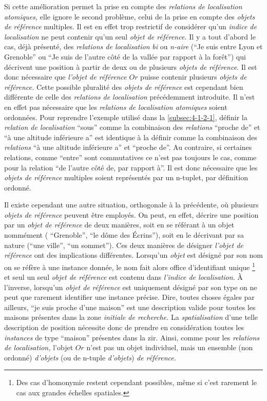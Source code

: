 Si cette amélioration permet la prise en compte des \emph{relations de
  localisation atomiques,} elle ignore le second problème, celui de la
prise en compte des \emph{objets de référence} multiples. Il est en
effet trop restrictif de considérer qu'un \emph{indice de
  localisation} ne peut contenir qu'un seul \emph{objet de référence.}
Il y a tout d'abord le cas, déjà présenté, des \emph{relations de
  localisation} \emph{bi} ou \emph{n-aire} (\eg \enquote{Je suis entre
  Lyon et Grenoble} ou \enquote{Je suis de l'autre côté de la vallée
  par rapport à la forêt}) qui décrivent une position à partir de deux
ou de plusieurs \emph{objets de référence}. Il est donc nécessaire que
\emph{l'objet de référence} \(Or\) puisse contenir plusieurs
\emph{objets de référence.} Cette possible pluralité des \emph{objets
  de référence} est cependant bien différente de celle des
\emph{relations de localisation} précédemment introduite. Il n'est en
effet pas nécessaire que les \emph{relations de localisation
  atomiques} soient ordonnées. Pour reprendre l'exemple utilisé dans
la \autoref{subsec:4-1-2-1}, définir la \emph{relation de
  localisation} \enquote{sous} comme la combinaison des
\emph{relations} \enquote{proche de} et \enquote{à une altitude
  inférieure a} est identique à la définir comme la combinaison des
\emph{relations} \enquote{à une altitude inférieure a} et
\enquote{proche de}. Au contraire, si certaines relations, comme
\enquote{entre} sont commutatives ce n'est pas toujours le cas, comme
pour la relation \enquote{de l'autre côté de, par rapport à}. Il est
donc nécessaire que les \emph{objets de référence} multiples soient
représentés par un n-tuplet, par définition ordonné.

Il existe cependant une autre situation, orthogonale à la précédente,
où plusieurs \emph{objets de référence} peuvent être employés. On
peut, en effet, décrire une position par un \emph{objet de référence}
de deux manières, soit en se référant à un objet nommément (\eg
\enquote{Grenoble}, \enquote{le dôme des Écrins}), soit en le
décrivant par sa nature (\eg \enquote{une ville}, \enquote{un
  sommet}). Ces deux manières de désigner \emph{l'objet de référence}
ont des implications différentes. Lorsqu'un \emph{objet} est désigné
par son nom on se réfère à une instance donnée, le nom fait alors
office d'identifiant unique \footnote{Des cas d’homonymie restent
  cependant possibles, même si c'est rarement le cas aux grandes
  échelles spatiales.} et seul un seul \emph{objet de référence} est
contenu dans \emph{l'indice de localisation}. À l'inverse, lorsqu'un
\emph{objet de référence} est uniquement désigné par son type on ne
peut que rarement identifier une instance précise. Dire, toutes choses
égales par ailleurs, \enquote{je suis proche d'une maison} est une
description valide pour toutes les maisons présentes dans la zone
\emph{initiale de recherche.} La \emph{spatialisation} d'une telle
description de position nécessite donc de prendre en considération
toutes les \emph{instances} de type \enquote{maison} présentes dans la
\ac{zir}. Ainsi, comme pour les \emph{relations de localisation,}
l'objet \(Or\) n'est pas un objet individuel, mais un ensemble (non
ordonné) \emph{d'objets} (ou de n-tuple \emph{d'objets}) \emph{de
  référence.}



